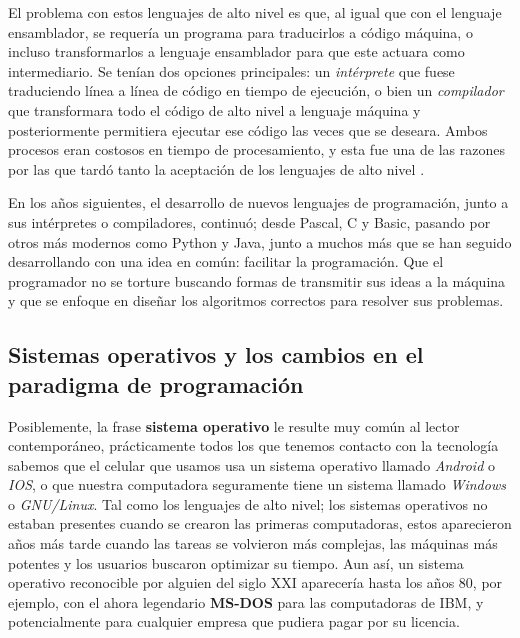 \documentclass[letterpaper,12pt,oneside]{book}
\begin{document}
        El problema con estos lenguajes de alto nivel es que, al igual que con el lenguaje ensamblador, se requería un programa
para traducirlos a código máquina, o incluso transformarlos a lenguaje ensamblador para que este actuara como intermediario. Se tenían dos opciones principales:
un \textit{intérprete} que fuese traduciendo línea a línea de código en tiempo de ejecución, o bien un \textit{compilador} que transformara todo el código de alto nivel a lenguaje máquina y posteriormente permitiera ejecutar ese código las veces que se deseara. Ambos
procesos eran costosos en tiempo de procesamiento, y esta fue una de las razones por las que tardó tanto la aceptación de los lenguajes de alto nivel
        \cite{oregan_brief_2012}.
		
		
		En los años siguientes, el desarrollo de nuevos lenguajes de programación, junto a sus intérpretes o compiladores, continuó; desde Pascal, C y Basic, pasando por otros más modernos 
		como Python y Java, junto a muchos más que
		se han seguido desarrollando con una idea en común: facilitar la programación. Que el programador no se torture buscando formas de transmitir sus
		ideas a la máquina y que se enfoque en diseñar los algoritmos correctos para resolver sus problemas.
		


		\clearpage
		\subsection{Sistemas operativos y los cambios en el paradigma de programación}
		
		Posiblemente, la frase \textbf{sistema operativo} le resulte muy común al lector contemporáneo, prácticamente todos los que tenemos contacto con
		la tecnología sabemos que el celular que usamos usa un sistema operativo llamado \textit{Android} o \textit{IOS}, o que nuestra computadora seguramente tiene
		un sistema llamado \textit{Windows} o  \textit{GNU/Linux}. Tal como los lenguajes
		de alto nivel; los sistemas operativos no estaban presentes cuando se crearon las primeras computadoras, estos aparecieron años más tarde cuando
		las tareas se volvieron más complejas, las máquinas más potentes y los usuarios buscaron optimizar su tiempo. Aun así, un sistema operativo
		reconocible por alguien del siglo XXI aparecería hasta los años 80, por ejemplo, con el ahora legendario \textbf{MS-DOS} para las computadoras de IBM, y potencialmente
		para cualquier empresa que pudiera pagar por su licencia.
		
\end{document}
